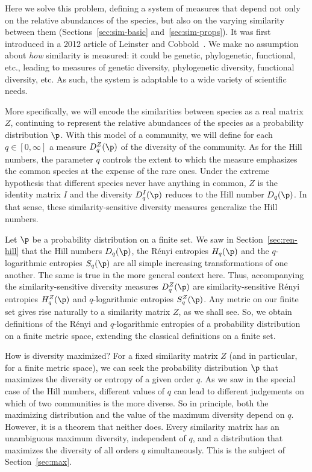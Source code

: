 Here we solve this problem, defining a system of measures that depend not
only on the relative abundances of the species, but also on the varying
similarity between them (Sections~\ref{sec:sim-basic}
and~\ref{sec:sim-props}).  It was first introduced in a 2012 article of
Leinster and Cobbold~\cite{MDISS}.%
%
%
We make no assumption about \emph{how} similarity is measured: it could be
genetic, phylogenetic, functional, etc., leading to measures of genetic
diversity, phylogenetic diversity, functional diversity, etc.  As such, the
system is adaptable to a wide variety of scientific needs.

More specifically, we will encode the similarities between species as a
real matrix $Z$, continuing to represent the relative abundances of the
species as a probability distribution $\p$.  With this model of a
community, we will define for each $q \in [0, \infty]$ a measure
$D_q^Z(\p)$ of the diversity of the community.  As for the Hill numbers,
the parameter $q$ controls%
% 
% 
the extent to which the measure emphasizes the common species at the
expense of the rare ones.  Under the extreme hypothesis that different
species never have anything in common, $Z$ is the identity matrix $I$ and
the diversity $D_q^I(\p)$ reduces to the Hill number $D_q(\p)$.  In that
sense, these similarity-sensitive diversity measures generalize the Hill
numbers.

Let $\p$ be a probability distribution on a finite set. We saw in
Section~\ref{sec:ren-hill} that the Hill numbers $D_q(\p)$, the R\'enyi
entropies $H_q(\p)$ and the $q$-logarithmic entropies $S_q(\p)$ are all
simple increasing transformations of one another.  The same is true in the
more general context here. Thus, accompanying the similarity-sensitive
diversity measures $D_q^Z(\p)$ are similarity-sensitive R\'enyi entropies
$H_q^Z(\p)$ and $q$-logarithmic entropies $S_q^Z(\p)$.  Any metric on our
finite set gives rise naturally to a similarity matrix $Z$, as we shall
see.  So, we obtain definitions of the R\'enyi and $q$-logarithmic
entropies of a probability distribution on a finite metric space, extending
the classical definitions on a finite set.

How is diversity maximized?  For a fixed similarity matrix $Z$ (and in
particular, for a finite metric space), we can seek the probability
distribution $\p$ that maximizes the diversity or entropy of a given order
$q$.  As we saw in the special case of the Hill numbers, different values
of $q$ can lead to different judgements on which of two communities is the
more diverse.  So in principle, both the maximizing distribution and the
value of the maximum diversity depend on $q$.  However, it is a theorem
that neither does.  Every similarity matrix has an unambiguous maximum
diversity, independent of $q$, and a distribution that maximizes the
diversity of all orders $q$ simultaneously.  This is the subject of
Section~\ref{sec:max}.

